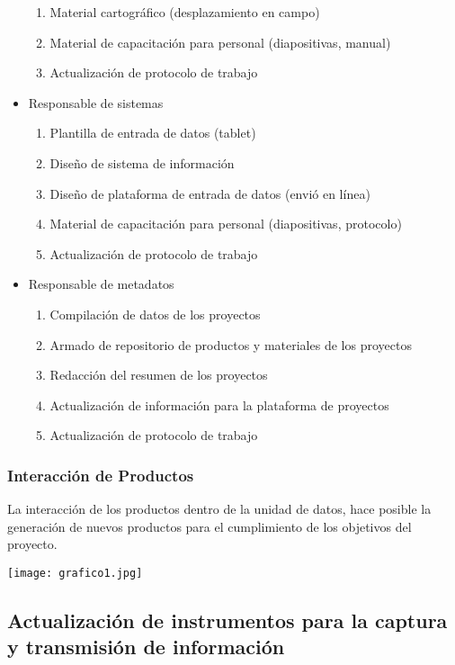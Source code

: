 \documentclass{article}
\begin{document}
\begin{itemize}
\begin{enumerate}
\item Material cartográfico (desplazamiento en campo)
\item Material de capacitación para personal (diapositivas, manual)
\item Actualización de protocolo de trabajo
\end{enumerate}
\item Responsable de sistemas
\begin{enumerate}
\item Plantilla de entrada de datos (tablet)
\item Diseño de sistema de información
\item Diseño de plataforma de entrada de datos (envió en línea)
\item Material de capacitación para personal (diapositivas, protocolo)
\item Actualización de protocolo de trabajo
\end{enumerate}
\item Responsable de metadatos
\begin{enumerate}
\item Compilación de datos de los proyectos
\item Armado de repositorio de productos y materiales de los proyectos
\item Redacción del resumen de los proyectos
\item Actualización de información para la plataforma de  proyectos
\item Actualización de protocolo de trabajo
\end{enumerate}
\end{itemize}

\subsubsection{Interacción de Productos}

La interacción de los productos dentro de la unidad de datos, hace posible la generación de nuevos productos para el cumplimiento de los objetivos del proyecto. 

\begin{center}
\texttt{[image: grafico1.jpg]}
\end{center}

\subsection{Actualización de instrumentos para la captura y transmisión de información}
\end{document}
